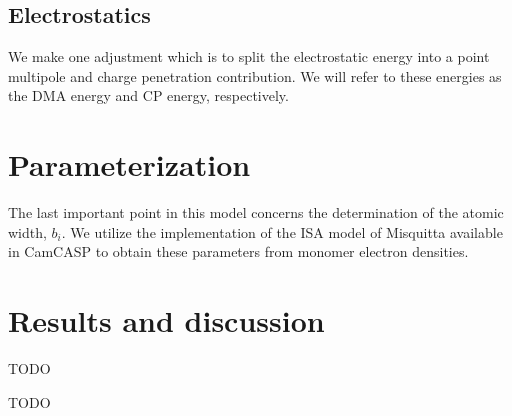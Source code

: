 \documentclass[journal=jacsat,manuscript=article]{achemso}
\begin{document}
\subsection*{Electrostatics}

We make one adjustment which is to split the electrostatic energy into
a point multipole and charge penetration contribution. We will refer to
these energies as the DMA energy and CP energy, respectively. 

\section{Parameterization}

The last important point in this model concerns the determination of the
atomic width, $b_i$. We utilize the implementation of the ISA model of
Misquitta\cite{misquitta2014distributed} available in CamCASP\cite{misquitta2016ab}
to obtain these parameters from monomer electron densities.

\section{Results and discussion}



\begin{acknowledgement}

TODO

\end{acknowledgement}

\begin{suppinfo}

TODO

\end{suppinfo}


\end{document}
